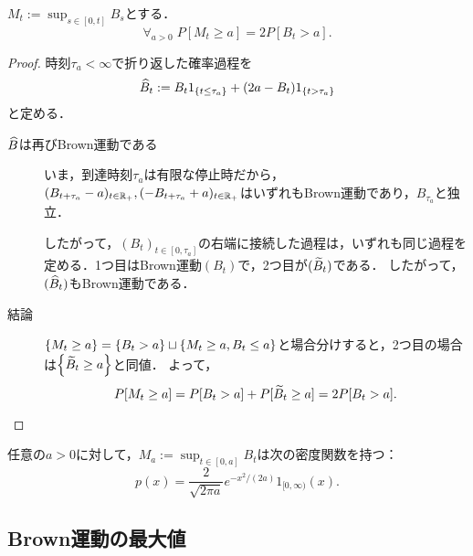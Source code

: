 \documentclass[uplatex,dvipdfmx]{jsreport}
\begin{document}
\begin{theorem}
    $M_t:=\sup_{s\in[0,t]}B_s$とする．
    \[\forall_{a>0}\;P[M_t\ge a]=2P[B_t>a].\]
\end{theorem}
\begin{proof}
    時刻$\tau_a<\infty$で折り返した確率過程を
    \[\widehat{B}_t:=B_t1_{\left\{t\le\tau_a\right\}}+(2a-B_t)1_{\left\{t>\tau_a\right\}}\]
    と定める．
    \begin{description}
        \item[$\widehat{B}$は再びBrown運動である] いま，到達時刻$\tau_a$は有限な停止時だから，$(B_{t+\tau_a}-a)_{t\in\mathbb{R}_+},(-B_{t+\tau_a}+a)_{t\in\mathbb{R}_+}$はいずれもBrown運動であり，$B_{\tau_a}$と独立．
        
        したがって，$(B_t)_{t\in[0,\tau_a]}$の右端に接続した過程は，いずれも同じ過程を定める．1つ目はBrown運動$(B_t)$で，2つ目が$(\widetilde{B}_t)$である．
        したがって，$(\widehat{B}_t)$もBrown運動である．
        \item[結論]
        $\{M_t\ge a\}=\left\{B_t>a\right\}\sqcup\left\{M_t\ge a,B_t\le a\right\}$と場合分けすると，2つ目の場合は$\left\{\widetilde{B}_t\ge a\right\}$と同値．
        よって，
        \[P[M_t\ge a]=P[B_t>a]+P[\widetilde{B}_t\ge a]=2P[B_t>a].\]
    \end{description}
\end{proof}

\begin{corollary}\label{cor-density-of-sup-process-of-Brownian-motion}
    任意の$a>0$に対して，$M_a:=\sup_{t\in[0,a]}B_t$は次の密度関数を持つ：
    \[p(x)=\frac{2}{\sqrt{2\pi a}}e^{-x^2/(2a)}1_{[0,\infty)}(x).\]
\end{corollary}

\subsection{Brown運動の最大値}
\end{document}
